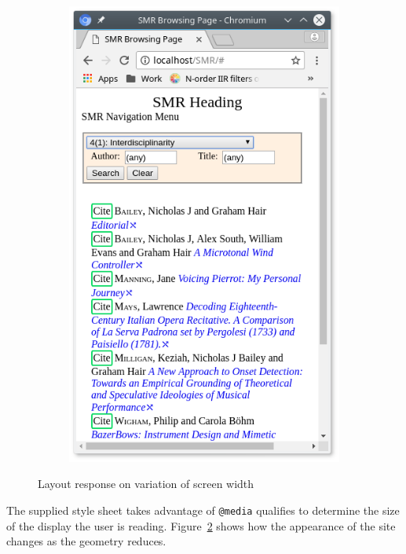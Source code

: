 \documentclass[a4paper,10pt]{SMR}
\begin{document}
\begin{figure}
\begin{subfigure}[t]{0.3\textwidth}
  \includegraphics[width=\textwidth]{SMR_page-narrow.png}
  \label{sf:narrower}
 \end{subfigure}
 \caption{Layout response on variation of screen width}
 \label{f:responsivelayout}
\end{figure}
The supplied style sheet takes advantage of \texttt{@media}
qualifies to determine the size of the display the user is reading.
Figure~\ref{f:responsivelayout} shows how the appearance of the site
changes as the geometry reduces.
\end{document}
